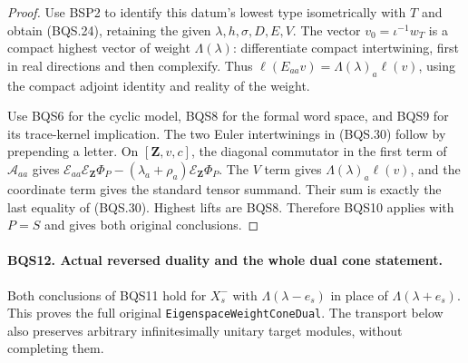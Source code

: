 \documentclass[11pt,a4paper]{article}
\numberwithin{equation}{section}
\theoremstyle{remark}\newtheorem{remark}[theorem]{Remark}
\begin{document}
\begin{proof}
Use BSP2 to identify this datum's lowest type isometrically with $T$
and obtain (BQS.24), retaining the given $\lambda,h,\sigma,D,E,V$.
The vector $v_0=\iota^{-1}w_T$ is a compact highest vector of weight
$\Lambda(\lambda)$: differentiate compact intertwining, first in real
directions and then complexify.
Thus $\ell(E_{aa}v)=\Lambda(\lambda)_a\ell(v)$, using the
compact adjoint identity and reality of the weight.

Use BQS6 for the cyclic model, BQS8 for the formal word space, and
BQS9 for its trace-kernel implication.
The two Euler intertwinings in (BQS.30) follow by prepending a letter.
On $[\mathbf Z,v,c]$, the diagonal commutator in the first term of
$\mathcal A_{aa}$ gives
$\mathcal E_{aa}\mathcal E_{\mathbf Z}\Phi_P
 -(\lambda_a+\rho_a)\mathcal E_{\mathbf Z}\Phi_P$.
The $V$ term gives $\Lambda(\lambda)_a\ell(v)$, and the coordinate
term gives the standard tensor summand.
Their sum is exactly the last equality of (BQS.30).
Highest lifts are BQS8.  Therefore BQS10 applies with $P=S$ and
gives both original conclusions.
\end{proof}

\paragraph{BQS12. Actual reversed duality and the whole dual cone statement.}
\label{claim:BQS12}
Both conclusions of BQS11 hold for $X_s^-$ with
$\Lambda(\lambda-e_s)$ in place of $\Lambda(\lambda+e_s)$.
This proves the full original \texttt{Eigenspace\allowbreak Weight\allowbreak Cone\allowbreak Dual}.
The transport below also preserves arbitrary infinitesimally unitary
target modules, without completing them.
\end{document}
